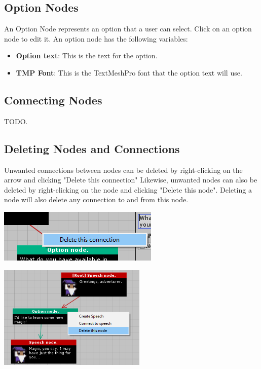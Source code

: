 \documentclass[a4paper,12pt]{article}
\begin{document}
\newpage

\subsection{Option Nodes}
An Option Node represents an option that a user can select.
\newline
Click on an option node to edit it. An option node has the following variables:

\begin{itemize}
\setlength\itemsep{1pt}
	\item \textbf{Option text}: This is the text for the option.
	\item \textbf{TMP Font}: This is the TextMeshPro font that the option text will use.
\end{itemize}

\subsection{Connecting Nodes}
TODO.

\subsection{Deleting Nodes and Connections}
Unwanted connections between nodes can be deleted by right-clicking on the arrow and clicking "Delete this connection"
\newline
Likewise, unwanted nodes can also be deleted by right-clicking on the node and clicking "Delete this node". Deleting a node will also delete any connection to and from this node.
\bigskip 

\begin{minipage}[c]{0.45\textwidth}
\centering
\includegraphics[keepaspectratio]{img/DeleteConnection.png}
\end{minipage}
\hfill
\begin{minipage}[c]{0.45\textwidth}
\centering
\includegraphics[width=200pt, keepaspectratio]{img/DeleteNode.png}
\end{minipage}
\end{document}
